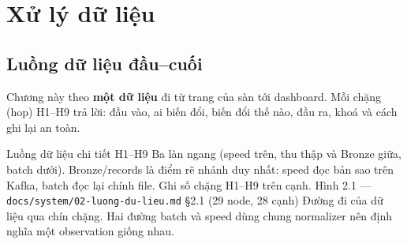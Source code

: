 \chapter{Xử lý dữ liệu}\label{chap:processing}

\section{Luồng dữ liệu đầu--cuối}
Chương này theo \textbf{một dữ liệu} đi từ trang của sàn tới dashboard. Mỗi chặng (hop) H1--H9 trả lời: đầu vào, ai biến đổi,
biến đổi thế nào, đầu ra, khoá và cách ghi lại an toàn.

  {Luồng dữ liệu chi tiết H1--H9}
  {Ba làn ngang (speed trên, thu thập và Bronze giữa, batch dưới). Bronze/records là điểm rẽ nhánh duy nhất: speed đọc bản sao trên Kafka, batch đọc lại chính file. Ghi số chặng H1--H9 trên cạnh.}
  {Hình 2.1 — \texttt{docs/system/02-luong-du-lieu.md} §2.1 (29 node, 28 cạnh)}
  {Đường đi của dữ liệu qua chín chặng. Hai đường batch và speed dùng chung normalizer nên định nghĩa một observation giống nhau.}

